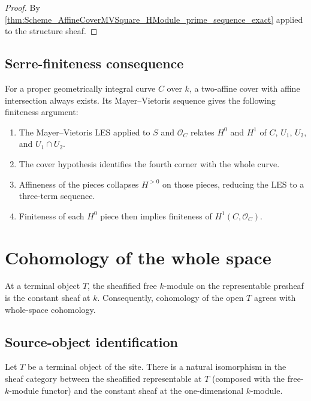 \begin{proof}


\leanok
  By \cref{thm:Scheme_AffineCoverMVSquare_HModule_prime_sequence_exact} applied to the structure sheaf.
\end{proof}

\subsection{Serre-finiteness consequence}

For a proper geometrically integral curve \(C\) over \(k\), a two-affine cover with affine intersection always exists. Its Mayer--Vietoris sequence gives the following finiteness argument:
\begin{enumerate}
  \item The Mayer--Vietoris LES applied to \(S\) and \(\mathcal O_C\) relates \(H^0\) and \(H^1\) of \(C\), \(U_1\), \(U_2\), and \(U_1 \cap U_2\).
  \item The cover hypothesis identifies the fourth corner with the whole curve.
  \item Affineness of the pieces collapses \(H^{>0}\) on those pieces, reducing the LES to a three-term sequence.
  \item Finiteness of each \(H^0\) piece then implies finiteness of \(H^1(C, \mathcal O_C)\).
\end{enumerate}
\section{Cohomology of the whole space}
\label{sec:cover_totality}

At a terminal object \(T\), the sheafified free \(k\)-module on the representable presheaf is the constant sheaf at \(k\). Consequently, cohomology of the open \(T\) agrees with whole-space cohomology.

\subsection{Source-object identification}

\begin{definition}\leanok
  \label{def:Scheme_HModule_prime_top_sourceIso}

  Let \(T\) be a terminal object of the site. There is a natural isomorphism in the sheaf category between the sheafified representable at \(T\) (composed with the free-\(k\)-module functor) and the constant sheaf at the one-dimensional \(k\)-module.
\end{definition}

